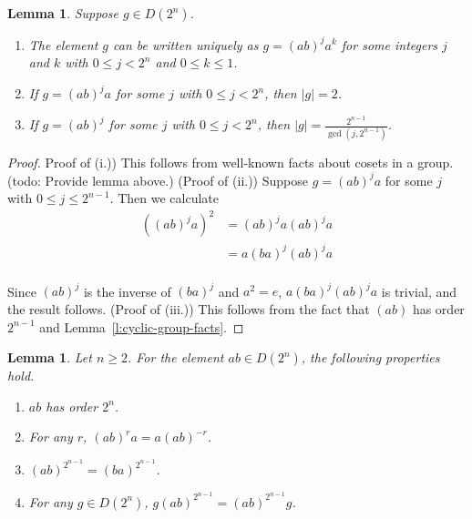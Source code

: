 \documentclass{amsart}
\numberwithin{equation} {section}
\newtheorem{lemma}[equation]{Lemma}
\theoremstyle{definition}
\begin{document}
\begin{lemma}\label{l:normal-form}
Suppose $g \in D(2^n)$. 
\begin{enumerate}
\item[(i.)] The element $g$ can be written uniquely as $g = (ab)^ja^k$ for some integers $j$ and $k$ with $0 \leq j < 2^{n}$ and $0 \leq k \leq 1$. 
\item[(ii.)] If $g = (ab)^ja$ for some $j$ with $0 \leq j < 2^{n}$, then $|g| = 2$. 
\item[(iii.)] If $g = (ab)^j$ for some $j$ with $0 \leq j < 2^{n}$, then $|g| = \displaystyle\frac{2^{n-1}}{\gcd(j,2^{n-1})}$. 
\end{enumerate}
\end{lemma}

\begin{proof}
Proof of (i.)) This follows from well-known facts about cosets in a group. (todo: Provide lemma above.) 
(Proof of (ii.)) Suppose $g = (ab)^ja$ for some $j$ with $0 \leq j \leq 2^{n-1}$. Then we calculate
\begin{align*}
((ab)^j a)^2 &= (ab)^j a (ab)^j a \\
&= a (ba)^j (ab)^j a \\
\end{align*}

Since $(ab)^j$ is the inverse of $(ba)^j$ and $a^2 = e$,  $a (ba)^j (ab)^j a$ is trivial, and the result follows. (Proof of (iii.)) This follows from the fact that $(ab)$ has order $2^{n-1}$ and Lemma~\ref{l:cyclic-group-facts}.
\end{proof}


\begin{lemma}\label{l:ab-order-lemma}
Let $n \geq 2$. For the element $ab \in D(2^n)$, the following properties hold. 
\begin{enumerate}
\item[(i.)] $ab$ has order $2^{n}$.
\item[(ii.)] For any $r$, $(ab)^{r}a = a(ab)^{-r}$. 
\item[(iii.)] $(ab)^{2^{n-1}} = (ba)^{2^{n-1}}$. 
\item[(iv.)] For any $g \in D(2^n)$, $g (ab)^{2^{n-1}} = (ab)^{2^{n-1}} g$. 
\end{enumerate}
\end{lemma}
\end{document}
